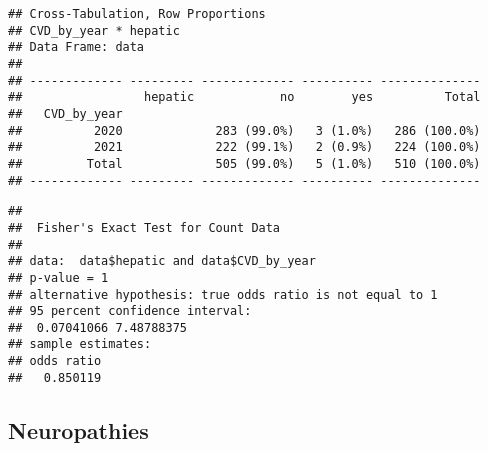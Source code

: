 \documentclass[
]{article}
\newenvironment{Shaded}{\begin{snugshade}}{\end{snugshade}}
\newcommand{\AttributeTok}[1]{\textcolor[rgb]{0.13,0.29,0.53}{#1}}
\newcommand{\ConstantTok}[1]{\textcolor[rgb]{0.56,0.35,0.01}{#1}}
\newcommand{\FunctionTok}[1]{\textcolor[rgb]{0.13,0.29,0.53}{\textbf{#1}}}
\newcommand{\NormalTok}[1]{#1}
\newcommand{\SpecialCharTok}[1]{\textcolor[rgb]{0.81,0.36,0.00}{\textbf{#1}}}
\newcommand{\StringTok}[1]{\textcolor[rgb]{0.31,0.60,0.02}{#1}}
\begin{document}
\begin{verbatim}
## Cross-Tabulation, Row Proportions  
## CVD_by_year * hepatic  
## Data Frame: data  
## 
## ------------- --------- ------------- ---------- --------------
##                 hepatic            no        yes          Total
##   CVD_by_year                                                  
##          2020             283 (99.0%)   3 (1.0%)   286 (100.0%)
##          2021             222 (99.1%)   2 (0.9%)   224 (100.0%)
##         Total             505 (99.0%)   5 (1.0%)   510 (100.0%)
## ------------- --------- ------------- ---------- --------------
\end{verbatim}

\begin{Shaded}
\end{Shaded}

\begin{verbatim}
## 
##  Fisher's Exact Test for Count Data
## 
## data:  data$hepatic and data$CVD_by_year
## p-value = 1
## alternative hypothesis: true odds ratio is not equal to 1
## 95 percent confidence interval:
##  0.07041066 7.48788375
## sample estimates:
## odds ratio 
##   0.850119
\end{verbatim}

\hypertarget{neuropathies}{%
\subsection{Neuropathies}\label{neuropathies}}

\begin{Shaded}
\end{Shaded}
\end{document}

